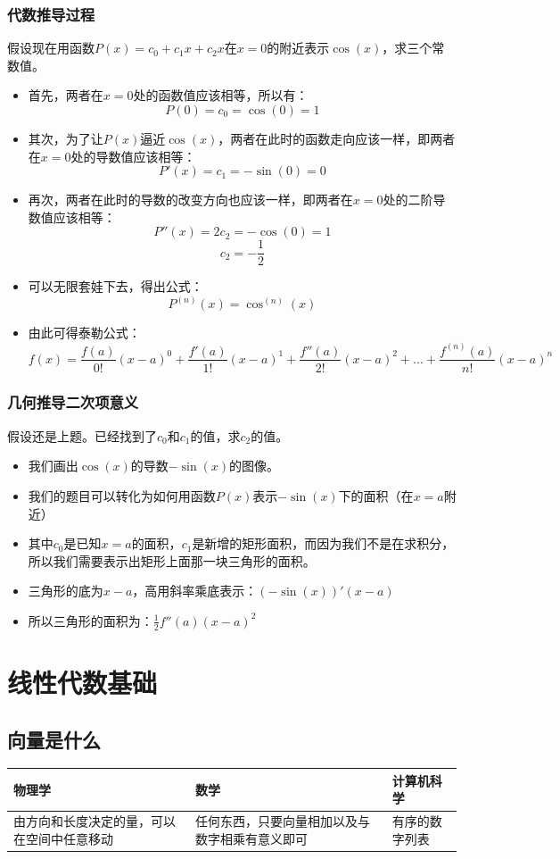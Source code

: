 \documentclass[UTF8]{ctexart}
\begin{document}
\subsubsection{代数推导过程}
假设现在用函数$P(x) = c_0 + c_1x + c_2x$在$x=0$的附近表示$\cos(x)$，求三个常数值。
\begin{itemize}
	\item 首先，两者在$x=0$处的函数值应该相等，所以有：$$P(0)=c_0=\cos(0)=1$$
	\item 其次，为了让$P(x)$逼近$\cos(x)$，两者在此时的函数走向应该一样，即两者在$x=0$处的导数值应该相等：$$P'(x)=c_1=-\sin(0)=0$$
	\item 再次，两者在此时的导数的改变方向也应该一样，即两者在$x=0$处的二阶导数值应该相等：$$P''(x)=2c_2=-\cos(0)=1$$ $$c_2=-\frac{1}{2}$$
	\item 可以无限套娃下去，得出公式：$$P^{(n)}(x) = \cos^{(n)}(x)$$
	\item 由此可得泰勒公式：$$f(x) = \frac{f(a)}{0!}(x-a)^0 + \frac{f'(a)}{1!}(x-a)^1 + \frac{f''(a)}{2!}(x-a)^2 + ... + \frac{f^{(n)}(a)}{n!}(x-a)^n$$
\end{itemize}
\subsubsection{几何推导二次项意义}
假设还是上题。已经找到了$c_0$和$c_1$的值，求$c_2$的值。
\begin{itemize}
	\item 我们画出$\cos(x)$的导数$-\sin(x)$的图像。
	\item 我们的题目可以转化为如何用函数$P(x)$表示$-\sin(x)$下的面积（在$x=a$附近）
	\item 其中$c_0$是已知$x=a$的面积，$c_1$是新增的矩形面积，而因为我们不是在求积分，所以我们需要表示出矩形上面那一块三角形的面积。
	\item 三角形的底为$x-a$，高用斜率乘底表示：$(-\sin(x))'(x-a)$
	\item 所以三角形的面积为：$\frac{1}{2}f''(a)(x-a)^2$
\end{itemize}



\newpage
\section{线性代数基础}
\subsection{向量是什么}
\begin{table}[h!]
	\begin{tabular}{|p{100pt}|p{100pt}|p{100pt}|}
		\hline
		物理学 & 数学 & 计算机科学 \\
		\hline
		由方向和长度决定的量，可以在空间中任意移动 & 任何东西，只要向量相加以及与数字相乘有意义即可 & 有序的数字列表 \\
		\hline
	\end{tabular}
\end{table}
\end{document}
